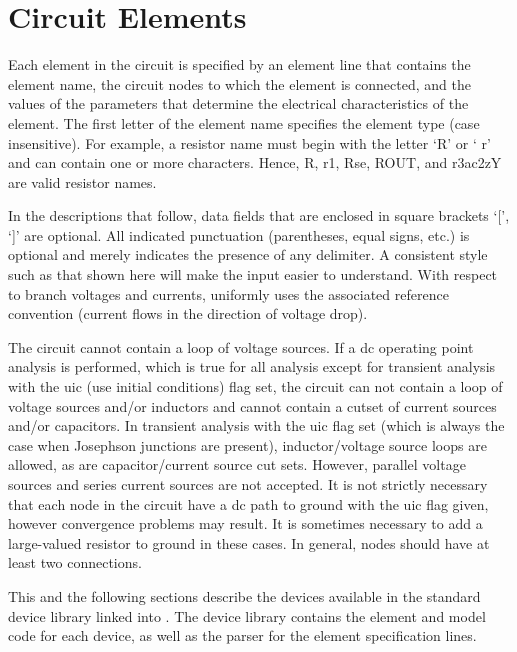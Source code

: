 
\section{Circuit Elements}


Each element in the circuit is specified by an element line that
contains the element name, the circuit nodes to which the element is
connected, and the values of the parameters that determine the
electrical characteristics of the element.  The first letter of the
element name specifies the element type (case insensitive).  For
example, a resistor name must begin with the letter `{\vt R}' or `{\vt
r}' and can contain one or more characters.  Hence, {\vt R}, {\vt r1},
{\vt Rse}, {\vt ROUT}, and {\vt r3ac2zY} are valid resistor names.

In the descriptions that follow, data fields that are enclosed in
square brackets `{\vt [}', `{\vt ]}' are optional.  All indicated
punctuation (parentheses, equal signs, etc.) is optional and merely
indicates the presence of any delimiter.  A consistent style such as
that shown here will make the input easier to understand.  With
respect to branch voltages and currents, {\WRspice} uniformly uses the
associated reference convention (current flows in the direction of
voltage drop).

The circuit cannot contain a loop of voltage sources.  If a dc
operating point analysis is performed, which is true for all analysis
except for transient analysis with the {\vt uic} (use initial
conditions) flag set, the circuit can not contain a loop of voltage
sources and/or inductors and cannot contain a cutset of current
sources and/or capacitors.  In transient analysis with the {\vt uic}
flag set (which is always the case when Josephson junctions are
present), inductor/voltage source loops are allowed, as are
capacitor/current source cut sets.  However, parallel voltage sources
and series current sources are not accepted.  It is not strictly
necessary that each node in the circuit have a dc path to ground with
the {\vt uic} flag given, however convergence problems may result.  It
is sometimes necessary to add a large-valued resistor to ground in
these cases.  In general, nodes should have at least two connections.

This and the following sections describe the devices available in the
standard device library linked into {\WRspice}.  The device library
contains the element and model code for each device, as well as the
parser for the element specification lines.

